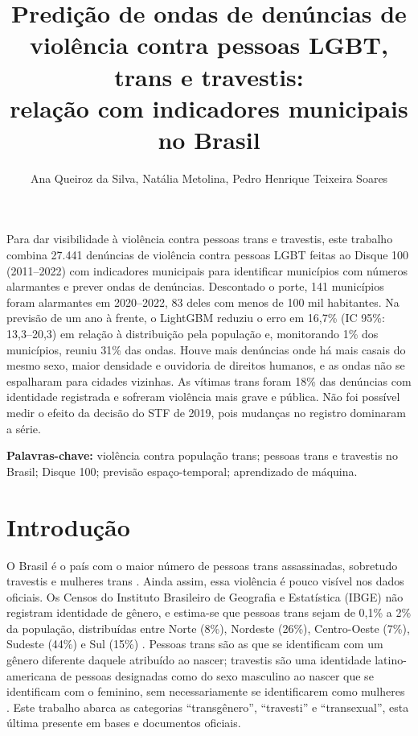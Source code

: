 \documentclass[12pt]{article}
\title{Predição de ondas de denúncias de violência contra pessoas LGBT, trans e travestis: \\ relação com indicadores municipais no Brasil}
\author{Ana Queiroz da Silva, Natália Metolina, Pedro Henrique Teixeira Soares}
\begin{document}
\maketitle
     
\begin{resumo}
Para dar visibilidade à violência contra pessoas trans e travestis, este trabalho combina 27.441 denúncias de violência contra pessoas LGBT feitas ao Disque 100 (2011--2022) com indicadores municipais para identificar municípios com números alarmantes e prever ondas de denúncias. Descontado o porte, 141 municípios foram alarmantes em 2020--2022, 83 deles com menos de 100 mil habitantes. Na previsão de um ano à frente, o LightGBM reduziu o erro em 16,7\% (IC 95\%: 13,3--20,3) em relação à distribuição pela população e, monitorando 1\% dos municípios, reuniu 31\% das ondas. Houve mais denúncias onde há mais casais do mesmo sexo, maior densidade e ouvidoria de direitos humanos, e as ondas não se espalharam para cidades vizinhas. As vítimas trans foram 18\% das denúncias com identidade registrada e sofreram violência mais grave e pública. Não foi possível medir o efeito da decisão do STF de 2019, pois mudanças no registro dominaram a série.

\textbf{Palavras-chave:} violência contra população trans; pessoas trans e travestis no Brasil; Disque 100; previsão espaço-temporal; aprendizado de máquina.
\end{resumo}


\clearpage
\section{Introdução}
\label{sec:introducao}

O Brasil é o país com o maior número de pessoas trans assassinadas, sobretudo travestis e mulheres trans \cite{marinho_tomazelli_firianelli:2024}. Ainda assim, essa violência é pouco visível nos dados oficiais. Os Censos do Instituto Brasileiro de Geografia e Estatística (IBGE) não registram identidade de gênero, e estima-se que pessoas trans sejam de 0,1\% a 2\% da população, distribuídas entre Norte (8\%), Nordeste (26\%), Centro-Oeste (7\%), Sudeste (44\%) e Sul (15\%) \cite{spizziri_eufrasio_lima:2021}. Pessoas trans são as que se identificam com um gênero diferente daquele atribuído ao nascer; travestis são uma identidade latino-americana de pessoas designadas como do sexo masculino ao nascer que se identificam com o feminino, sem necessariamente se identificarem como mulheres \cite{leal_silva_lizzi:2026}. Este trabalho abarca as categorias ``transgênero'', ``travesti'' e ``transexual'', esta última presente em bases e documentos oficiais.
\end{document}
